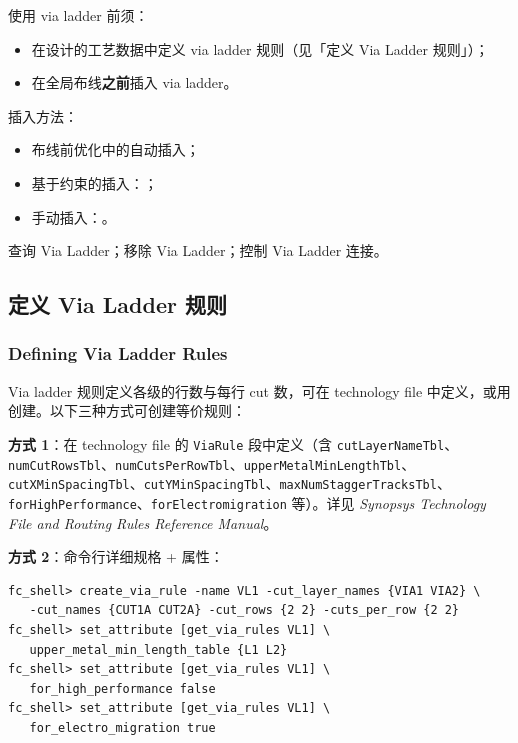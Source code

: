 使用 via ladder 前须：
\begin{itemize}
  \item 在设计的工艺数据中定义 via ladder 规则（见「定义 Via Ladder 规则」）；
  \item 在全局布线\textbf{之前}插入 via ladder。
\end{itemize}

插入方法：
\begin{itemize}
  \item 布线前优化中的自动插入；
  \item 基于约束的插入：；
  \item 手动插入：。
\end{itemize}

\begin{seeAlsoBox}
查询 Via Ladder；移除 Via Ladder；控制 Via Ladder 连接。
\end{seeAlsoBox}

\subsection{定义 Via Ladder 规则}
\subsubsection*{Defining Via Ladder Rules}

Via ladder 规则定义各级的行数与每行 cut 数，可在 technology file 中定义，或用  创建。以下三种方式可创建等价规则：

\textbf{方式 1}：在 technology file 的 \texttt{ViaRule} 段中定义（含 \texttt{cutLayerNameTbl}、\texttt{numCutRowsTbl}、\texttt{numCutsPerRowTbl}、\texttt{upperMetalMinLengthTbl}、\texttt{cutXMinSpacingTbl}、\texttt{cutYMinSpacingTbl}、\texttt{maxNumStaggerTracksTbl}、\texttt{forHighPerformance}、\texttt{forElectromigration} 等）。详见 \textit{Synopsys Technology File and Routing Rules Reference Manual}。

\textbf{方式 2}：命令行详细规格 + 属性：
\begin{lstlisting}
fc_shell> create_via_rule -name VL1 -cut_layer_names {VIA1 VIA2} \
   -cut_names {CUT1A CUT2A} -cut_rows {2 2} -cuts_per_row {2 2}
fc_shell> set_attribute [get_via_rules VL1] \
   upper_metal_min_length_table {L1 L2}
fc_shell> set_attribute [get_via_rules VL1] \
   for_high_performance false
fc_shell> set_attribute [get_via_rules VL1] \
   for_electro_migration true
\end{lstlisting}

